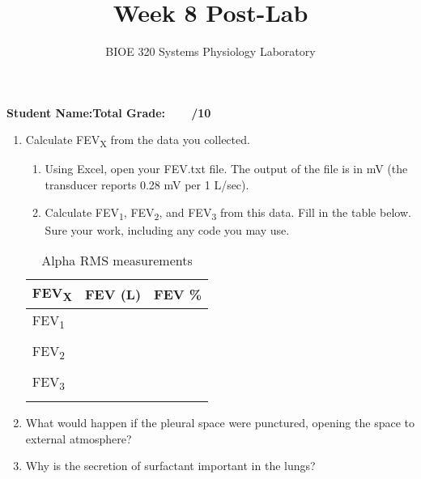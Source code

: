 \documentclass{article}
\title{Week 8 Post-Lab}
\author{BIOE 320 Systems Physiology Laboratory}
\date{}
\begin{document}
\maketitle
\large

\textbf{Student Name:}\hfill 	\textbf{Total Grade:\ \ \ \ /10}\vspace{0.5cm}

\begin{enumerate}
	\item Calculate FEV\textsubscript{X} from the data you collected.\begin{enumerate}
	\item Using Excel, open your FEV.txt file. The output of the file is in mV (the transducer reports 0.28 mV per 1 L/sec).
	\item Calculate FEV\textsubscript{1}, FEV\textsubscript{2}, and FEV\textsubscript{3} from this data. Fill in the table below. Sure your work, including any code you may use.
		\end{enumerate}
	
		\begin{table}[h]
	\centering
	\caption{Alpha RMS measurements}
	\begin{tabular}[h!]{p{}|p{}p{}}
	\toprule
	FEV\textsubscript{X} & FEV (L) & FEV \%\\
	\midrule
	FEV\textsubscript{1} & &\\ & &\\ \midrule
	FEV\textsubscript{2} & &\\ & &\\ \midrule
	FEV\textsubscript{3} & &\\ & &\\ \bottomrule
	\end{tabular}
	\end{table}
	
	\item What would happen if the pleural space were punctured, opening the space to external atmosphere?
	\item Why is the secretion of surfactant important in the lungs?
\end{enumerate}
\end{document}
